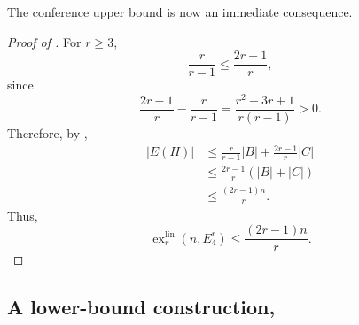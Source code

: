 \documentclass[11pt,a4paper]{article}
\theoremstyle{definition}
\theoremstyle{remark}
\begin{document}
The conference upper bound is now an immediate consequence.

\begin{proof}[Proof of ]
For \(r\geq3\),
$$
\frac{r}{r-1}
\leq
\frac{2r-1}{r},
$$
since
$$
\frac{2r-1}{r}-\frac{r}{r-1}
=
\frac{r^2-3r+1}{r(r-1)}
>0.
$$
Therefore, by ,
$$
\begin{aligned}
|E(H)|
&\leq
\frac{r}{r-1}|B|
+
\frac{2r-1}{r}|C|\\
&\leq
\frac{2r-1}{r}(|B|+|C|)\\
&\leq
\frac{(2r-1)n}{r}.
\end{aligned}
$$
Thus,
$$
\operatorname{ex}^{\mathrm{lin}}_r(n,E_4^r)
\leq
\frac{(2r-1)n}{r}.
$$
\end{proof}

\subsection{A lower-bound construction, }
\label{subsec:crown-lower-bound}
\end{document}
